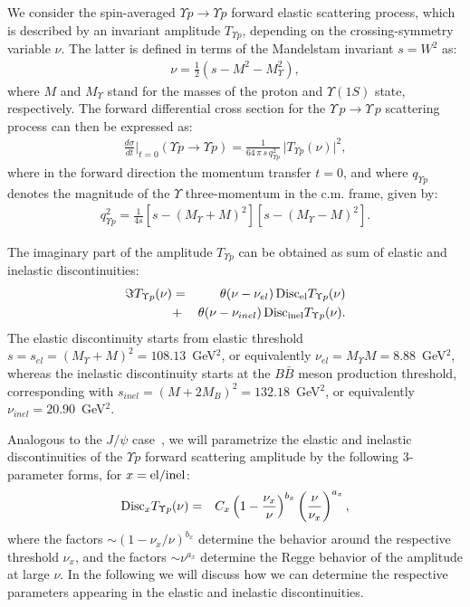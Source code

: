 \documentclass[prd,amsmath,twocolumn,floatfix,amssymb, preprintnumbers, linenumbers,nofootinbib, superscriptaddress]{revtex4}
\newcommand{\bea}{\begin{eqnarray}}
\newcommand{\eea}{\end{eqnarray}}
\begin{document}
We consider the spin-averaged $\Upsilon p \to \Upsilon p$ forward elastic scattering process, which is described by an invariant amplitude $T_{\Upsilon p}$, depending on the crossing-symmetry variable $\nu$. The latter is defined in terms of the Mandelstam invariant $s =W^2$ as:
\bea
\nu = \frac{1}{2} (s - M^2 - M_\Upsilon^2),
\eea
where $M$ and $M_\Upsilon$ stand for the masses of the proton and $\Upsilon(1S)$ state, respectively.  
The forward differential cross section for the $\Upsilon \, p \to \Upsilon \, p$ scattering process can then be expressed as:
\bea
\frac{d \sigma}{dt} \biggr|_{t = 0} (\Upsilon p \to \Upsilon p) = \frac{1}{64 \, \pi \, s \, q_{\Upsilon p}^2} \, \big| T_{\Upsilon p}(\nu) \big|^2,
\eea
where in the forward direction the momentum transfer $t = 0$, and where $q_{\Upsilon p}$ denotes the magnitude of the $\Upsilon$ three-momentum in the c.m. frame, given by:
 \bea 
 q_{\Upsilon p}^2  = \frac{1}{4 s} \left[ s - (M_\Upsilon + M)^2 \right] \left[ s - (M_\Upsilon - M)^2 \right].
 \eea 
 
The imaginary part of the amplitude $T_{\Upsilon p}$ can be obtained as sum of elastic and inelastic discontinuities:
\bea
\Im T_{\Upsilon p}(\nu)  &=& \theta(\nu - \nu_{el}) \,  {\rm Disc}_{\rm el} T_{\Upsilon p}(\nu) \nonumber \\
&+&   \theta(\nu - \nu_{inel}) \,  {\rm Disc}_{\rm inel} T_{\Upsilon p}(\nu).
\label{eq:disctot}
\eea
The elastic discontinuity starts from elastic threshold $s = s_{el} = (M_\Upsilon + M)^2 = 108.13$~GeV$^2$, or equivalently $\nu_{el} = M_\Upsilon M = 8.88$~GeV$^2$, whereas the inelastic discontinuity starts at the $B \bar B$ meson production threshold, corresponding with $s_{inel} = (M + 2 M_B)^2 = 132.18$~GeV$^2$, or equivalently $\nu_{inel} = 20.90$~GeV$^2$. 

Analogous to the $J/\psi$ case~\cite{Gryniuk:2016mpk}, we will parametrize the elastic and inelastic discontinuities of the $\Upsilon p$  forward scattering amplitude by the following 3-parameter forms, for $x = {\rm el/inel}$:
\bea
{\rm Disc}_{x} T_{\Upsilon p}(\nu)  &=& 
C_{x} \left( 1 - \frac{\nu_{x}}{\nu} \right)^{b_{x}}  \left( \frac{\nu}{\nu_{x}} \right)^{a_{x}} ,
\label{eq:discx} 
\eea
where the factors $\sim (1 - \nu_x / \nu)^{b_x}$  
determine the behavior around the respective threshold $\nu_x$, and the 
factors  $\sim \nu^{a_x}$ determine the Regge behavior of the amplitude at large $\nu$. 
In the following we will discuss how we can determine the respective parameters 
appearing in the elastic and inelastic discontinuities. 
\end{document}
